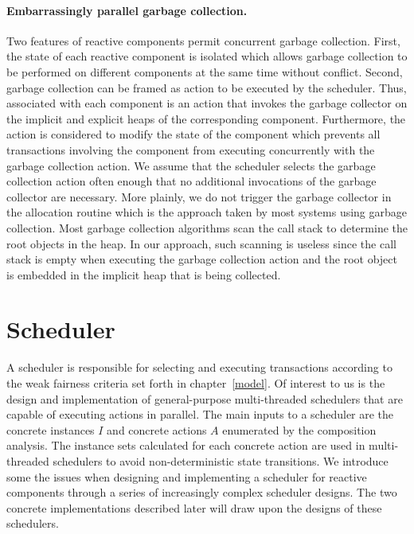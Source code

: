 \paragraph{Embarrassingly parallel garbage collection.}
Two features of reactive components permit concurrent garbage collection.
First, the state of each reactive component is isolated which allows garbage collection to be performed on different components at the same time without conflict.
Second, garbage collection can be framed as action to be executed by the scheduler.
Thus, associated with each component is an action that invokes the garbage collector on the implicit and explicit heaps of the corresponding component.
Furthermore, the action is considered to modify the state of the component which prevents all transactions involving the component from executing concurrently with the garbage collection action.
We assume that the scheduler selects the garbage collection action often enough that no additional invocations of the garbage collector are necessary.
More plainly, we do not trigger the garbage collector in the allocation routine which is the approach taken by most systems using garbage collection.
Most garbage collection algorithms scan the call stack to determine the root objects in the heap.
In our approach, such scanning is useless since the call stack is empty when executing the garbage collection action and the root object is embedded in the implicit heap that is being collected.

\section{Scheduler}

A scheduler is responsible for selecting and executing transactions according to the weak fairness criteria set forth in chapter~\ref{model}.
Of interest to us is the design and implementation of general-purpose multi-threaded schedulers that are capable of executing actions in parallel.
The main inputs to a scheduler are the concrete instances $I$ and concrete actions $A$ enumerated by the composition analysis.
The instance sets calculated for each concrete action are used in multi-threaded schedulers to avoid non-deterministic state transitions.
We introduce some the issues when designing and implementing a scheduler for reactive components through a series of increasingly complex scheduler designs.
The two concrete implementations described later will draw upon the designs of these schedulers.

